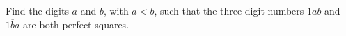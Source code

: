 Find the digits $a$ and $b$, with $a<b$, such that the three-digit numbers $\overline{1ab}$ and $\overline{1ba}$ are both perfect squares.
